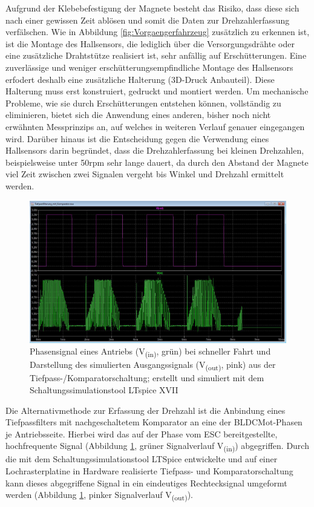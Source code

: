 Aufgrund der Klebebefestigung der Magnete besteht das Risiko, dass diese sich nach einer gewissen Zeit ablösen und somit die Daten zur Drehzahlerfassung verfälschen. Wie in Abbildung \ref{fig:Vorgaengerfahrzeug} zusätzlich zu erkennen ist, ist die Montage des Hallsensors, die lediglich über die Versorgungsdrähte oder eine zusätzliche Drahtstütze realisiert ist, sehr anfällig auf Erschütterungen. Eine zuverlässige und weniger erschütterungsempfindliche Montage des Hallsensors erfodert deshalb eine zusätzliche Halterung (3D-Druck Anbauteil). Diese Halterung muss erst konstruiert, gedruckt und montiert werden. Um mechanische Probleme, wie sie durch Erschütterungen entstehen können, vollständig zu eliminieren, bietet sich die Anwendung eines anderen, bisher noch nicht erwähnten Messprinzips an, auf welches in weiteren Verlauf genauer eingegangen wird. Darüber hinaus ist die Entscheidung gegen die Verwendung eines Hallsensors darin begründet, dass die Drehzahlerfassung bei kleinen Drehzahlen, beispielsweise unter 50rpm sehr lange dauert, da durch den Abstand der Magnete viel Zeit zwischen zwei Signalen vergeht bis Winkel und Drehzahl ermittelt werden.

\begin{figure}[H] %
\includegraphics[width=.92\textwidth]{sec4/images/Signaldarstellung} 
\centering
\captionsetup{width=.95\textwidth}
\caption[Phaseneingangssignal und Ausgangssignal der Tiefpass-/Komparatorschaltung]{Phasensignal eines Antriebs (V\textsubscript{(in)}, grün) bei schneller Fahrt und Darstellung des simulierten Ausgangssignals (V\textsubscript{(out)}, pink) aus der Tiefpass-/Komparatorschaltung; erstellt und simuliert mit dem Schaltungssimulationstool LTspice XVII}\centering
\label{fig:Signaldarstellung}
\end{figure}

Die Alternativmethode zur Erfassung der Drehzahl ist die Anbindung eines Tiefpassfilters mit nachgeschaltetem Komparator an eine der \ac{BLDCMot}-Phasen je Antriebsseite. Hierbei wird das auf der Phase vom \ac{ESC} bereitgestellte, hochfrequente Signal (Abbildung \ref{fig:Signaldarstellung}, grüner Signalverlauf V\textsubscript{(in)}) abgegriffen. Durch die mit dem Schaltungssimulationstool LTSpice entwickelte und auf einer Lochrasterplatine in Hardware realisierte Tiefpass- und Komparatorschaltung kann dieses abgegriffene Signal in ein eindeutiges Rechtecksignal umgeformt werden (Abbildung \ref{fig:Signaldarstellung}, pinker Signalverlauf V\textsubscript{(out)}).\vspace{11pt}

